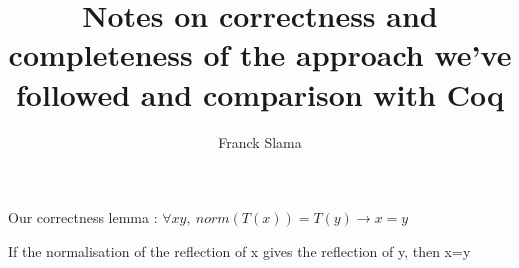 \documentclass{llncs}
\begin{document}
%
\frontmatter          %
%
\pagestyle{headings}  %
%

\mainmatter              %
%
\title{Notes on correctness and completeness of the approach we've followed and comparison with Coq} 
%
%
\author{Franck Slama}
%
%
%

\maketitle              %



Our correctness lemma :
$\forall x y,\ norm (T(x)) = T(y) \rightarrow x = y$

If the normalisation of the reflection of x gives the reflection of y, then x=y
\end{document}
